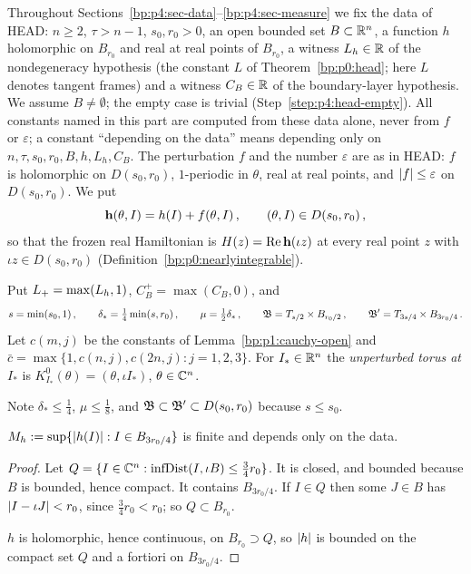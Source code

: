 Throughout Sections~\ref{bp:p4:sec-data}--\ref{bp:p4:sec-measure} we fix the data of HEAD:
$n\ge2$, $\tau>n-1$, $s_0,r_0>0$, an open bounded set $B\subset\mathbb{R}^n$, a function $h$ holomorphic on
$B_{r_0}$ and real at real points of $B_{r_0}$, a witness $L_h\in\mathbb{R}$ of the nondegeneracy hypothesis (the constant $L$ of
Theorem~\ref{bp:p0:head}; here $L$ denotes tangent frames)
and a witness $C_B\in\mathbb{R}$ of the boundary-layer hypothesis. We assume $B\ne\emptyset$; the empty
case is trivial (Step~\ref{step:p4:head-empty}). All constants named in this part are computed from
these data alone, never from $f$ or $\varepsilon$; a constant ``depending on the data'' means
depending only on $n,\tau,s_0,r_0,B,h,L_h,C_B$. The perturbation $f$ and the number $\varepsilon$
are as in HEAD: $f$ is holomorphic on $D(s_0,r_0)$, $1$-periodic in $\theta$, real at real points,
and $\lvert f\rvert\le\varepsilon$ on $D(s_0,r_0)$. We put
\begin{equation*}
\mathbf{h}(\theta,I)=h(I)+f(\theta,I)\,,\qquad (\theta,I)\in D(s_0,r_0)\,,
\end{equation*}
so that the frozen real Hamiltonian is $H(z)=\operatorname{Re}\mathbf{h}(\iota z)$ at every real point
$z$ with $\iota z\in D(s_0,r_0)$ (Definition~\ref{bp:p0:nearlyintegrable}).

\begin{definition}\label{bp:p4:data}
Put $L_{+}=\max(L_h,1)$, $C_B^+=\max(C_B,0)$, and
\begin{equation*}
s=\min(s_0,1)\,,\qquad \delta_*=\tfrac14\min(s,r_0)\,,\qquad \mu=\tfrac12\delta_*\,,\qquad
\mathfrak{B}=T_{s/2}\times B_{r_0/2}\,,\qquad \mathfrak{B}'=T_{3s/4}\times B_{3r_0/4}\,.
\end{equation*}
Let $c(m,j)$ be the constants of Lemma~\ref{bp:p1:cauchy-open} and
$\bar c=\max\{1,c(n,j),c(2n,j):j=1,2,3\}$. For $I_*\in\mathbb{R}^n$ the \emph{unperturbed torus at $I_*$}
is $K^0_{I_*}(\theta)=(\theta,\iota I_*)$, $\theta\in\mathbb{C}^n$.
\end{definition}

Note $\delta_*\le\frac14$, $\mu\le\frac18$, and $\mathfrak{B}\subset\mathfrak{B}'\subset D(s_0,r_0)$ because
$s\le s_0$.

\begin{lemma}\label{bp:p4:h-bounded}
$M_h:=\sup\{\lvert h(I)\rvert:I\in B_{3r_0/4}\}$ is finite and depends only on the data.
\end{lemma}

\begin{proof}
\label{step:p4:hbdd-compact}
Let $Q=\{I\in\mathbb{C}^n:\operatorname{infDist}(I,\iota B)\le\frac34r_0\}$. It is closed, and bounded because $B$ is
bounded, hence compact. It contains $B_{3r_0/4}$. If $I\in Q$ then some $J\in B$ has
$\lvert I-\iota J\rvert<r_0$, since $\frac34r_0<r_0$; so $Q\subset B_{r_0}$.

\label{step:p4:hbdd-continuity}
$h$ is holomorphic, hence continuous, on $B_{r_0}\supset Q$, so $\lvert h\rvert$ is bounded on the
compact set $Q$ and a fortiori on $B_{3r_0/4}$.
\end{proof}

